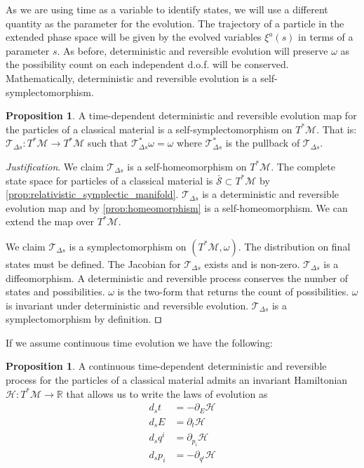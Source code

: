 \documentclass[smallextended]{svjour3}
\numberwithin{equation}{section}
\newenvironment{justification}{\emph{Justification}.}{\hfill\(\qed\)}
\theoremstyle{definition}
\newtheorem{prop}[equation]{Proposition}
\newenvironment{justification}{\emph{Justification}.}{\qed}
\begin{document}
As we are using time as a variable to identify states, we will use a different quantity as the parameter for the evolution. The trajectory of a particle in the extended phase space will be given by the evolved variables $\xi^a(s)$ in terms of a parameter $s$. As before, deterministic and reversible evolution will preserve $\omega$ as the possibility count on each independent d.o.f. will be conserved. Mathematically, deterministic and reversible evolution is a self-symplectomorphism.

\begin{prop}\label{prop:relativistic_symplectomorphism}
	A time-dependent deterministic and reversible evolution map for the particles of a classical material is a self-symplectomorphism on $T^*\mathcal{M}$. That is: $\mathcal{T}_{\Delta s}: T^*\mathcal{M} \rightarrow T^*\mathcal{M}$ such that $\mathcal{T}_{\Delta s}^*\omega = \omega$ where $\mathcal{T}_{\Delta s}^*$ is the pullback of $\mathcal{T}_{\Delta s}$.
\end{prop}

\begin{justification}
	We claim $\mathcal{T}_{\Delta s}$ is a self-homeomorphism on $T^*\mathcal{M}$. The complete state space for particles of a classical material is $\bar{\mathcal{S}} \subset T^*\mathcal{M}$ by \ref{prop:relativistic_symplectic_manifold}. $\mathcal{T}_{\Delta s}$ is a deterministic and reversible evolution map and by \ref{prop:homeomorphism} is a self-homeomorphism. We can extend the map over $T^*\mathcal{M}$.
	
	We claim $\mathcal{T}_{\Delta s}$ is a symplectomorphism on $(T^*\mathcal{M}, \omega)$. The distribution on final states must be defined. The Jacobian for $\mathcal{T}_{\Delta s}$ exists and is non-zero. $\mathcal{T}_{\Delta s}$ is a diffeomorphism. A deterministic and reversible process conserves the number of states and possibilities. $\omega$ is the two-form that returns the count of possibilities. $\omega$ is invariant under deterministic and reversible evolution. $\mathcal{T}_{\Delta s}$ is a symplectomorphism by definition.
\end{justification}

If we assume continuous time evolution we have the following:

\begin{prop}\label{prop:relativistic_hamiltons_equations}
	A continuous time-dependent deterministic and reversible process for the particles of a classical material admits an invariant Hamiltonian $\mathcal{H}: T^*\mathcal{M} \rightarrow \mathbb{R}$ that allows us to write the laws of evolution as
	\begin{align*}
	d_{s}t &= - \partial_{E} \mathcal{H} \\
	d_{s}E &= \partial_{t} \mathcal{H} \\
	d_{s}q^i &= \partial_{p_i} \mathcal{H} \\
	d_{s}p_i &= - \partial_{q^i} \mathcal{H}
	\end{align*}
\end{prop}
\end{document}
